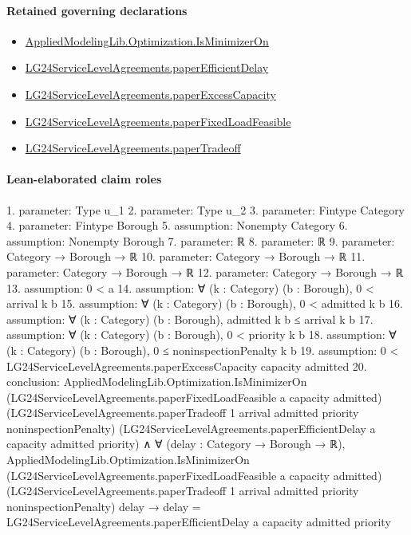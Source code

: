 \documentclass[10pt]{article}
\begin{document}
\paragraph{Retained governing declarations}
\begin{itemize}\raggedright
\item \hyperlink{governing-declaration-797bcd85b4b26271}{Applied\allowbreak{}Modeling\allowbreak{}Lib.\allowbreak{}Optimization.\allowbreak{}Is\allowbreak{}Minimizer\allowbreak{}On}
\item \hyperlink{governing-declaration-70a77d3cfca440a2}{LG24\allowbreak{}Service\allowbreak{}Level\allowbreak{}Agreements.\allowbreak{}paper\allowbreak{}Efficient\allowbreak{}Delay}
\item \hyperlink{governing-declaration-cfc6c9e8c89655cd}{LG24\allowbreak{}Service\allowbreak{}Level\allowbreak{}Agreements.\allowbreak{}paper\allowbreak{}Excess\allowbreak{}Capacity}
\item \hyperlink{governing-declaration-862f3b4b0c8cef67}{LG24\allowbreak{}Service\allowbreak{}Level\allowbreak{}Agreements.\allowbreak{}paper\allowbreak{}Fixed\allowbreak{}Load\allowbreak{}Feasible}
\item \hyperlink{governing-declaration-e97abe374e080da1}{LG24\allowbreak{}Service\allowbreak{}Level\allowbreak{}Agreements.\allowbreak{}paper\allowbreak{}Tradeoff}
\end{itemize}
\paragraph{Lean-elaborated claim roles}\begin{ReviewVerbatim}
1. parameter: Type u_1
2. parameter: Type u_2
3. parameter: Fintype Category
4. parameter: Fintype Borough
5. assumption: Nonempty Category
6. assumption: Nonempty Borough
7. parameter: ℝ
8. parameter: ℝ
9. parameter: Category → Borough → ℝ
10. parameter: Category → Borough → ℝ
11. parameter: Category → Borough → ℝ
12. parameter: Category → Borough → ℝ
13. assumption: 0 < a
14. assumption: ∀ (k : Category) (b : Borough), 0 < arrival k b
15. assumption: ∀ (k : Category) (b : Borough), 0 < admitted k b
16. assumption: ∀ (k : Category) (b : Borough), admitted k b ≤ arrival k b
17. assumption: ∀ (k : Category) (b : Borough), 0 < priority k b
18. assumption: ∀ (k : Category) (b : Borough), 0 ≤ noninspectionPenalty k b
19. assumption: 0 < LG24ServiceLevelAgreements.paperExcessCapacity capacity admitted
20. conclusion: AppliedModelingLib.Optimization.IsMinimizerOn (LG24ServiceLevelAgreements.paperFixedLoadFeasible a capacity admitted)
    (LG24ServiceLevelAgreements.paperTradeoff 1 arrival admitted priority noninspectionPenalty)
    (LG24ServiceLevelAgreements.paperEfficientDelay a capacity admitted priority) ∧
  ∀ (delay : Category → Borough → ℝ),
    AppliedModelingLib.Optimization.IsMinimizerOn
        (LG24ServiceLevelAgreements.paperFixedLoadFeasible a capacity admitted)
        (LG24ServiceLevelAgreements.paperTradeoff 1 arrival admitted priority noninspectionPenalty) delay →
      delay = LG24ServiceLevelAgreements.paperEfficientDelay a capacity admitted priority
\end{ReviewVerbatim}
\end{document}
